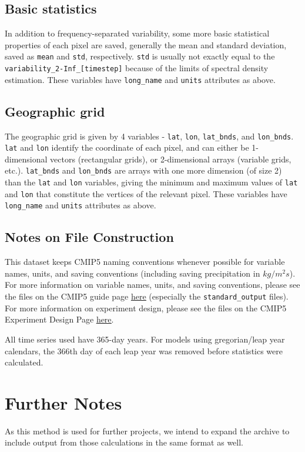 \documentclass[11pt]{amsart}
\begin{document}
\subsection{Basic statistics}
In addition to frequency-separated variability, some more basic statistical properties of each pixel are saved, generally the mean and standard deviation, saved as \texttt{mean} and \texttt{std}, respectively. \texttt{std} is usually not exactly equal to the \texttt{variability\_2-Inf\_[timestep]} because of the limits of spectral density estimation. These variables have \texttt{long\_name} and \texttt{units} attributes as above. 

\subsection{Geographic grid}
The geographic grid is given by 4 variables - \texttt{lat}, \texttt{lon}, \texttt{lat\_bnds}, and \texttt{lon\_bnds}. \texttt{lat} and \texttt{lon} identify the coordinate of each pixel, and can either be 1-dimensional vectors (rectangular grids), or 2-dimensional arrays (variable grids, etc.). \texttt{lat\_bnds} and \texttt{lon\_bnds} are arrays with one more dimension (of size 2) than the \texttt{lat} and \texttt{lon} variables, giving the minimum and maximum values of \texttt{lat} and \texttt{lon} that constitute the vertices of the relevant pixel. These variables have \texttt{long\_name} and \texttt{units} attributes as above. 

\subsection{Notes on File Construction}
This dataset keeps CMIP5 naming conventions whenever possible for variable names, units, and saving conventions (including saving precipitation in $kg/m^2s$). For more information on variable names, units, and saving conventions, please see the files on the CMIP5 guide page \href{http://cmip-pcmdi.llnl.gov/cmip5/guide_to_cmip5.html}{\underline{here}} (especially the \texttt{standard\_output} files). For more information on experiment design, please see the files on the CMIP5 Experiment Design Page \href{http://cmip-pcmdi.llnl.gov/cmip5/experiment_design.html}{\underline{here}}. 

All time series used have 365-day years. For models using gregorian/leap year calendars, the 366th day of each leap year was removed before statistics were calculated. 

\section{Further Notes}
As this method is used for further projects, we intend to expand the archive to include output from those calculations in the same format as well.
\end{document}
